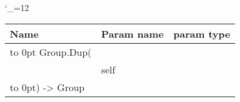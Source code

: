 \begingroup \catcode`\_=12 \tt
\begin{tabular}{lll}
\toprule
\textrm{Name}&\textrm{Param name}&\textrm{param type}\\
\midrule
\hbox to 0pt {Group.Dup(\hss}\\
& self\\
\hbox to 0pt{) -> Group\hss}\\
\bottomrule
\end{tabular}
\endgroup
